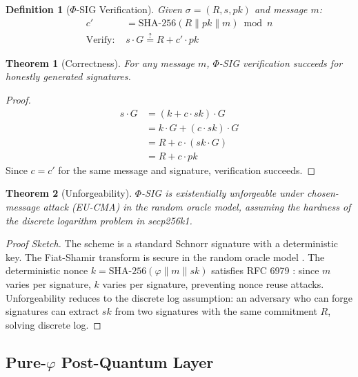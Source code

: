\documentclass{article}
\newtheorem{theorem}{Theorem}[section]
\newtheorem{definition}{Definition}[section]
\begin{document}
\begin{definition}[$\Phi$-SIG Verification]
Given $\sigma = (R, s, pk)$ and message $m$:
\begin{align}
c' &= \text{SHA-256}(R \parallel pk \parallel m) \bmod n \label{eq:cprime} \\
\text{Verify: } &s \cdot G \stackrel{?}{=} R + c' \cdot pk \label{eq:verify}
\end{align}
\end{definition}

\begin{theorem}[Correctness]
For any message $m$, $\Phi$-SIG verification succeeds for honestly generated signatures.
\end{theorem}

\begin{proof}
\begin{align}
s \cdot G &= (k + c \cdot sk) \cdot G \nonumber \\
&= k \cdot G + (c \cdot sk) \cdot G \nonumber \\
&= R + c \cdot (sk \cdot G) \nonumber \\
&= R + c \cdot pk \nonumber
\end{align}
Since $c = c'$ for the same message and signature, verification succeeds.
\end{proof}

\begin{theorem}[Unforgeability]
$\Phi$-SIG is existentially unforgeable under chosen-message attack (EU-CMA) in the random oracle model, assuming the hardness of the discrete logarithm problem in secp256k1.
\end{theorem}

\begin{proof}[Proof Sketch]
The scheme is a standard Schnorr signature with a deterministic key. The Fiat-Shamir transform is secure in the random oracle model \cite{pointcheval2000}. The deterministic nonce $k = \text{SHA-256}(\varphi \parallel m \parallel sk)$ satisfies RFC 6979 \cite{rfc6979}: since $m$ varies per signature, $k$ varies per signature, preventing nonce reuse attacks. Unforgeability reduces to the discrete log assumption: an adversary who can forge signatures can extract $sk$ from two signatures with the same commitment $R$, solving discrete log.
\end{proof}

\subsection{Pure-$\varphi$ Post-Quantum Layer}
\end{document}
